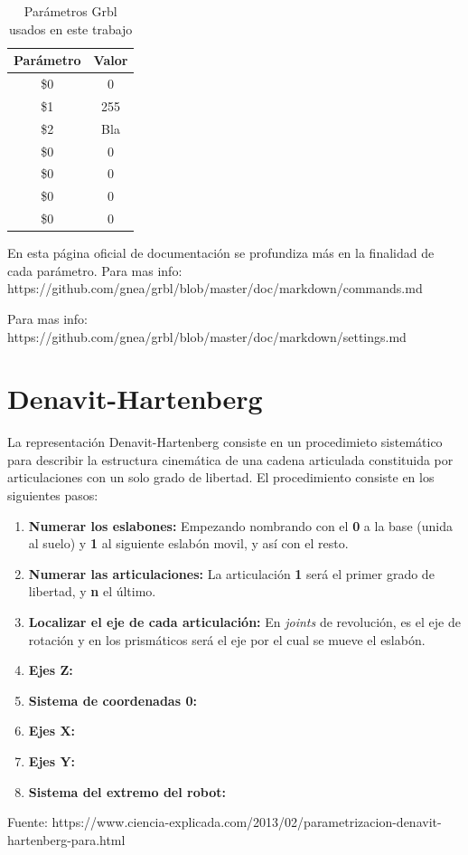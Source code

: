 \begin{table}[H]
\begin{center}
\begin{tabular}{|c|c|}
\hline
\textbf{Parámetro} & \textbf{Valor} \\
\hline
\$0 & 0 \\
\$1 & 255 \\
\$2 & Bla \\
\$0 & 0 \\
\$0 & 0 \\
\$0 & 0 \\
\$0 & 0 \\

\end{tabular}
\caption{Parámetros Grbl usados en este trabajo}
\label{cuadro:parametros_grbl}
\end{center}
\end{table}

En esta página oficial de documentación se profundiza más en la finalidad de cada parámetro.
Para mas info: https://github.com/gnea/grbl/blob/master/doc/markdown/commands.md

Para mas info: https://github.com/gnea/grbl/blob/master/doc/markdown/settings.md

\section{Denavit-Hartenberg}
La representación Denavit-Hartenberg consiste en un procedimieto sistemático para describir la estructura cinemática de una cadena 
articulada constituida por articulaciones con un solo grado de libertad. El procedimiento consiste en los siguientes pasos:
\begin{enumerate}
\item \textbf{Numerar los eslabones:} Empezando nombrando con el \textbf{0} a la base (unida al suelo) y \textbf{1} al siguiente eslabón movil, y así con el resto.
\item \textbf{Numerar las articulaciones:} La articulación \textbf{1} será el primer grado de libertad, y \textbf{n} el último.
\item \textbf{Localizar el eje de cada articulación:} En \textit{joints} de revolución, es el eje de rotación y en los prismáticos será 
el eje por el cual se mueve el eslabón.
\item \textbf{Ejes Z:}
\item \textbf{Sistema de coordenadas 0:}
\item \textbf{Ejes X:}
\item \textbf{Ejes Y:}
\item \textbf{Sistema del extremo del robot:}


\end{enumerate}
Fuente: https://www.ciencia-explicada.com/2013/02/parametrizacion-denavit-hartenberg-para.html

